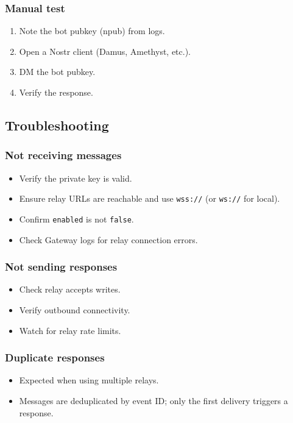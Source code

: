 \subsubsection{Manual test}


\begin{enumerate}
  \item Note the bot pubkey (npub) from logs.
  \item Open a Nostr client (Damus, Amethyst, etc.).
  \item DM the bot pubkey.
  \item Verify the response.
\end{enumerate}


\subsection{Troubleshooting}


\subsubsection{Not receiving messages}


\begin{itemize}
  \item Verify the private key is valid.
  \item Ensure relay URLs are reachable and use \texttt{wss://} (or \texttt{ws://} for local).
  \item Confirm \texttt{enabled} is not \texttt{false}.
  \item Check Gateway logs for relay connection errors.
\end{itemize}


\subsubsection{Not sending responses}


\begin{itemize}
  \item Check relay accepts writes.
  \item Verify outbound connectivity.
  \item Watch for relay rate limits.
\end{itemize}


\subsubsection{Duplicate responses}


\begin{itemize}
  \item Expected when using multiple relays.
  \item Messages are deduplicated by event ID; only the first delivery triggers a response.
\end{itemize}


